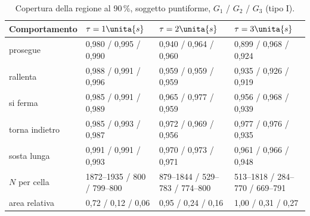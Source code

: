 \begin{table}[H]\centering\footnotesize
\caption{Copertura della regione al 90\,\%, soggetto puntiforme, $G_1$ / $G_2$ / $G_3$ (tipo I). }\label{tab:val-copertura}
\begin{tabular}{@{}llll@{}}
\toprule
Comportamento & $\tau=1\unita{s}$ & $\tau=2\unita{s}$ & $\tau=3\unita{s}$\\
\midrule
prosegue & 0,980 / 0,995 / 0,990 & 0,940 / 0,964 / 0,960 & 0,899 / 0,968 / 0,924\\
rallenta & 0,988 / 0,991 / 0,996 & 0,959 / 0,959 / 0,959 & 0,935 / 0,926 / 0,919\\
si ferma & 0,985 / 0,991 / 0,989 & 0,965 / 0,977 / 0,959 & 0,956 / 0,968 / 0,939\\
torna indietro & 0,985 / 0,993 / 0,987 & 0,972 / 0,969 / 0,956 & 0,977 / 0,976 / 0,935\\
sosta lunga & 0,991 / 0,991 / 0,993 & 0,970 / 0,973 / 0,971 & 0,961 / 0,966 / 0,948\\
\midrule
$N$ per cella & 1872–1935 / 800 / 799–800 & 879–1844 / 529–783 / 774–800 & 513–1818 / 284–770 / 669–791\\
area relativa & 0,72 / 0,12 / 0,06 & 0,95 / 0,24 / 0,16 & 1,00 / 0,31 / 0,27\\
\bottomrule
\end{tabular}
\end{table}

